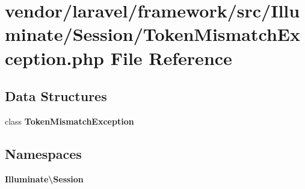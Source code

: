 \section{vendor/laravel/framework/src/\+Illuminate/\+Session/\+Token\+Mismatch\+Exception.php File Reference}
\label{_token_mismatch_exception_8php}
\subsection*{Data Structures}
\begin{DoxyCompactItemize}
\item 
class {\bf Token\+Mismatch\+Exception}
\end{DoxyCompactItemize}
\subsection*{Namespaces}
\begin{DoxyCompactItemize}
\item 
 {\bf Illuminate\textbackslash{}\+Session}
\end{DoxyCompactItemize}
